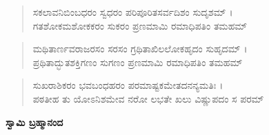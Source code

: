 \begin{verse}
ಸಕಲಾವನಿಬಿಂಬಧರಂ ಸ್ವಧರಂ ಪರಿಪೂರಿತಸರ್ವದಿಶಂ ಸುದೃಶಮ್ ।\\ಗತಶೋಕಮಶೋಕಕರಂ ಸುಕರಂ ಪ್ರಣಮಾಮಿ ರಮಾಧಿಪತಿಂ ತಮಹಮ್ 
\end{verse}

\begin{verse}
ಮಥಿತಾರ್ಣವರಾಜರಸಂ ಸರಸಂ ಗ್ರಥಿತಾಖಿಲಲೋಕಹೃದಂ ಸುಹೃದಮ್ ।\\ಪ್ರಥಿತಾದ್ಭುತಶಕ್ತಿಗಣಂ ಸುಗಣಂ ಪ್ರಣಮಾಮಿ ರಮಾಧಿಪತಿಂ ತಮಹಮ್ 
\end{verse}

\begin{verse}
ಸುಖರಾಶಿಕರಂ ಭವಬಂಧಹರಂ ಪರಮಾಷ್ಟಕಮೇತದನನ್ಯಮತಿಃ ।\\ಪಠತೀಹ ತು ಯೋಽನಿಶಮೇವ ನರೋ ಲಭತೇ ಖಲು ವಿಷ್ಣುಪದಂ ಸ ಪರಮ್ 
\end{verse}

\begin{flushright}
\textbf{ಸ್ವಾಮಿ ಬ್ರಹ್ಮಾನಂದ}
\end{flushright}

